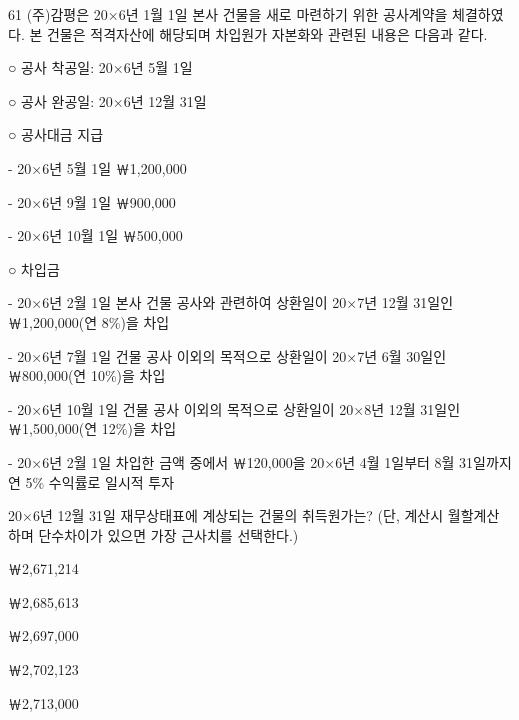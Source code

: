 \begin{question}{61}
(주)감평은 20×6년 1월 1일 본사 건물을 새로 마련하기 위한 공사계약을 체결하였다. 본 건물은 적격자산에 해당되며 차입원가 자본화와 관련된 내용은 다음과 같다.
\begin{framedtext}
○ 공사 착공일: 20×6년 5월 1일 \par
○ 공사 완공일: 20×6년 12월 31일 \par
○ 공사대금 지급 \par
\hspace*{0.5em}- 20×6년 5월 1일 ￦1,200,000 \par
\hspace*{0.5em}- 20×6년 9월 1일 ￦900,000 \par
\hspace*{0.5em}- 20×6년 10월 1일 ￦500,000 \par
○ 차입금 \par
\hspace*{0.5em}- 20×6년 2월 1일 본사 건물 공사와 관련하여 상환일이 20×7년 12월 31일인 ￦1,200,000(연 8\%)을 차입 \par
\hspace*{0.5em}- 20×6년 7월 1일 건물 공사 이외의 목적으로 상환일이 20×7년 6월 30일인 ￦800,000(연 10\%)을 차입 \par
\hspace*{0.5em}- 20×6년 10월 1일 건물 공사 이외의 목적으로 상환일이 20×8년 12월 31일인 ￦1,500,000(연 12\%)을 차입 \par
\hspace*{0.5em}- 20×6년 2월 1일 차입한 금액 중에서 ￦120,000을 20×6년 4월 1일부터 8월 31일까지 연 5\% 수익률로 일시적 투자 \par
\end{framedtext}
20×6년 12월 31일 재무상태표에 계상되는 건물의 취득원가는? (단, 계산시 월할계산하며 단수차이가 있으면 가장 근사치를 선택한다.)
\begin{choices}
  \item ￦2,671,214
  \item ￦2,685,613
  \item ￦2,697,000
  \item ￦2,702,123
  \item ￦2,713,000
\end{choices}
\end{question}
